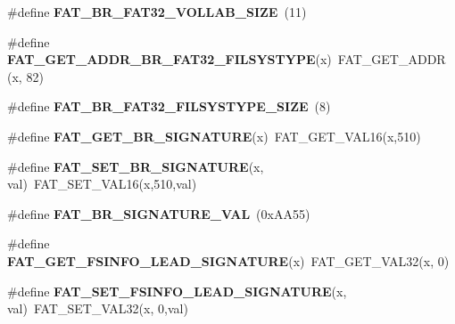 \begin{DoxyCompactItemize}
\item 
\mbox{\label{group__libfs__dosfs_ga8eeeb68c63d199c875a61223e57c18c2}} 
\#define {\bfseries F\+A\+T\+\_\+\+B\+R\+\_\+\+F\+A\+T32\+\_\+\+V\+O\+L\+L\+A\+B\+\_\+\+S\+I\+ZE}~(11)
\item 
\mbox{\label{group__libfs__dosfs_ga9277ca0aea1c172bad484243dea60e4b}} 
\#define {\bfseries F\+A\+T\+\_\+\+G\+E\+T\+\_\+\+A\+D\+D\+R\+\_\+\+B\+R\+\_\+\+F\+A\+T32\+\_\+\+F\+I\+L\+S\+Y\+S\+T\+Y\+PE}(x)~F\+A\+T\+\_\+\+G\+E\+T\+\_\+\+A\+D\+DR (x, 82)
\item 
\mbox{\label{group__libfs__dosfs_gada50bdb7da82d2c6438a0ddaa2aced2d}} 
\#define {\bfseries F\+A\+T\+\_\+\+B\+R\+\_\+\+F\+A\+T32\+\_\+\+F\+I\+L\+S\+Y\+S\+T\+Y\+P\+E\+\_\+\+S\+I\+ZE}~(8)
\item 
\mbox{\label{group__libfs__dosfs_ga0d9ea41126e4cb3db9796364138fc4df}} 
\#define {\bfseries F\+A\+T\+\_\+\+G\+E\+T\+\_\+\+B\+R\+\_\+\+S\+I\+G\+N\+A\+T\+U\+RE}(x)~F\+A\+T\+\_\+\+G\+E\+T\+\_\+\+V\+A\+L16(x,510)
\item 
\mbox{\label{group__libfs__dosfs_gaf32aec185e026c5c5145204efb348ba9}} 
\#define {\bfseries F\+A\+T\+\_\+\+S\+E\+T\+\_\+\+B\+R\+\_\+\+S\+I\+G\+N\+A\+T\+U\+RE}(x,  val)~F\+A\+T\+\_\+\+S\+E\+T\+\_\+\+V\+A\+L16(x,510,val)
\item 
\mbox{\label{group__libfs__dosfs_ga19b0f75edb97b1db27cb4845edfdba17}} 
\#define {\bfseries F\+A\+T\+\_\+\+B\+R\+\_\+\+S\+I\+G\+N\+A\+T\+U\+R\+E\+\_\+\+V\+AL}~(0x\+A\+A55)
\item 
\mbox{\label{group__libfs__dosfs_gae892a363bc9d1f09bf4006d9dba4886c}} 
\#define {\bfseries F\+A\+T\+\_\+\+G\+E\+T\+\_\+\+F\+S\+I\+N\+F\+O\+\_\+\+L\+E\+A\+D\+\_\+\+S\+I\+G\+N\+A\+T\+U\+RE}(x)~F\+A\+T\+\_\+\+G\+E\+T\+\_\+\+V\+A\+L32(x,  0)
\item 
\mbox{\label{group__libfs__dosfs_gad159c76e804b8e99378c20db37ec10ca}} 
\#define {\bfseries F\+A\+T\+\_\+\+S\+E\+T\+\_\+\+F\+S\+I\+N\+F\+O\+\_\+\+L\+E\+A\+D\+\_\+\+S\+I\+G\+N\+A\+T\+U\+RE}(x,  val)~F\+A\+T\+\_\+\+S\+E\+T\+\_\+\+V\+A\+L32(x,  0,val)

\end{DoxyCompactItemize}
